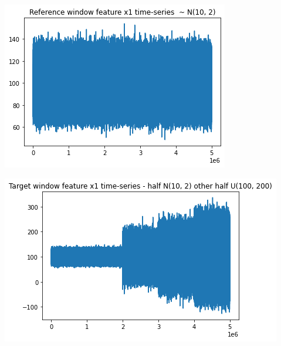 \begin{center}
\begin{minipage}{.5\textwidth}
  \centering
  \includegraphics[width=1\linewidth]{figures/timeseries-r3.png}
  \label{fig:timeseries-r3}
\end{minipage}%
\begin{minipage}{.5\textwidth}
  \centering
  \includegraphics[width=1.2\linewidth]{figures/timeseries-t3.png}
  \label{fig:timeseries-t3}
\end{minipage}
\end{center}

